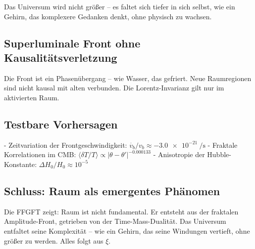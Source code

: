 	Das Universum wird nicht größer – es faltet sich tiefer in sich selbst, wie ein Gehirn, das komplexere Gedanken denkt, ohne physisch zu wachsen.
	
	\subsection*{Superluminale Front ohne Kausalitätsverletzung}
	
	Die Front ist ein Phasenübergang – wie Wasser, das gefriert. Neue Raumregionen sind nicht kausal mit alten verbunden. Die Lorentz-Invarianz gilt nur im aktivierten Raum.
	
	\subsection*{Testbare Vorhersagen}
	
	- Zeitvariation der Frontgeschwindigkeit: $\dot{v_b} / v_b \approx -\SI{3.0e-21}{\per\second}$
	- Fraktale Korrelationen im CMB: $\langle \delta T / T \rangle \propto |\theta - \theta'|^{-0.000133}$
	- Anisotropie der Hubble-Konstante: $\Delta H_0 / H_0 \approx 10^{-5}$
	
	\subsection*{Schluss: Raum als emergentes Phänomen}
	
	Die FFGFT zeigt: Raum ist nicht fundamental. Er entsteht aus der fraktalen Amplitude-Front, getrieben von der Time-Mass-Dualität. Das Universum entfaltet seine Komplexität – wie ein Gehirn, das seine Windungen vertieft, ohne größer zu werden. Alles folgt aus $\xi$.




